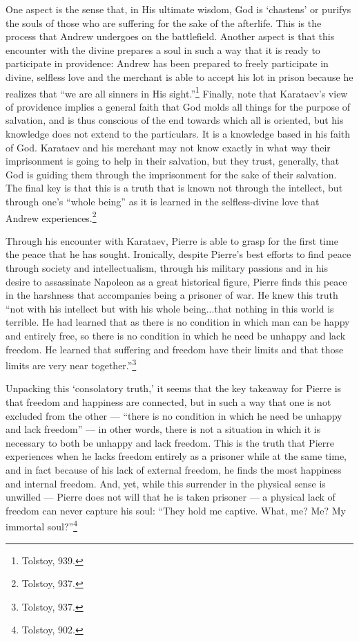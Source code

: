 \documentclass[12pt]{article}
\begin{document}
One aspect is the sense that, in His ultimate wisdom, God is `chastens’ or purifys the souls of those who are suffering for the sake of the afterlife. This is the process that Andrew undergoes on the battlefield. Another aspect is that this encounter with the divine prepares a soul in such a way that it is ready to participate in providence: Andrew has been prepared to freely participate in divine, selfless love and the merchant is able to accept his lot in prison because he realizes that ``we are all sinners in His sight.''\footnote{Tolstoy, 939.} Finally, note that Karataev’s view of providence implies a general faith that God molds all things for the purpose of salvation, and is thus conscious of the end towards which all is oriented, but his knowledge does not extend to the particulars. It is a knowledge based in his faith of God. Karataev and his merchant may not know exactly in what way their imprisonment is going to help in their salvation, but they trust, generally, that God is guiding them through the imprisonment for the sake of their salvation. The final key is that this is a truth that is known not through the intellect, but through one’s “whole being” as it is learned in the selfless-divine love that Andrew experiences.\footnote{Tolstoy, 937.}

Through his encounter with Karataev, Pierre is able to grasp for the first time the peace that he has sought. Ironically, despite Pierre’s best efforts to find peace through society and intellectualism, through his military passions and in his desire to assassinate Napoleon as a great historical figure, Pierre finds this peace in the harshness that accompanies being a prisoner of war. He knew this truth ``not with his intellect but with his whole being...that nothing in this world is terrible. He had learned that as there is no condition in which man can be happy and entirely free, so there is no condition in which he need be unhappy and lack freedom. He learned that suffering and freedom have their limits and that those limits are very near together.''\footnote{Tolstoy, 937.}

Unpacking this `consolatory truth,’ it seems that the key takeaway for Pierre is that freedom and happiness are connected, but in such a way that one is not excluded from the other — ``there is no condition in which he need be unhappy and lack freedom'' — in other words, there is not a situation in which it is necessary to both be unhappy and lack freedom. This is the truth that Pierre experiences when he lacks freedom entirely as a prisoner while at the same time, and in fact because of his lack of external freedom, he finds the most happiness and internal freedom. And, yet, while this surrender in the physical sense is unwilled — Pierre does not will that he is taken prisoner — a physical lack of freedom can never capture his soul: ``They hold me captive. What, me? Me? My immortal soul?''\footnote{Tolstoy, 902.}
 
\end{document}
